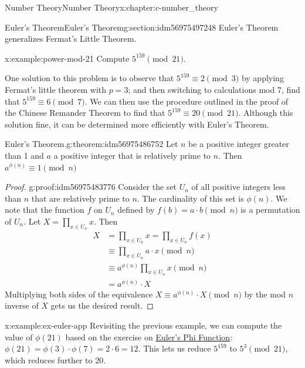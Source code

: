 \documentclass[twoside,10pt,]{book}
\numberwithin{equation}{section}
\begin{document}
\begin{chapterptx}{Number Theory}{}{Number Theory}{}{}{x:chapter:c-number_theory}
\typeout{************************************************}
%
\begin{sectionptx}{Euler's Theorem}{}{Euler's Theorem}{}{}{g:section:idm56975497248}
Euler's Theorem generalizes Fermat's Little Theorem.%
\begin{example}{}{x:example:power-mod-21}%
Compute \(5^{159} \pmod{21}\).%
\par
One solution to this problem is to observe that \(5^{159}\equiv 2 \pmod{3}\)  by applying Fermat's little theorem with \(p=3\); and then switching to calculations mod 7, find that \(5^{159}\equiv 6 \pmod{7}\).  We can then use the procedure outlined in the proof of the Chinese Remander Theorem to find that \(5^{159}\equiv 20 \pmod{21}\). Although this solution fine, it can be determined more efficiently with Euler's Theorem.%
\end{example}
\begin{theorem}{Euler's Theorem.}{}{g:theorem:idm56975486752}%
%
Let \(n\) be a positive integer greater than 1 and \(a\) a positive integer that is relatively prime to \(n\).  Then  \(a^{\phi(n)} \equiv 1 \pmod{n}\)%
\end{theorem}
\begin{proof}{}{g:proof:idm56975483776}
Consider the set \(U_n\) of all positive integers less than \(n\) that are relatively prime to \(n\). The cardinality of this set is \(\phi(n)\).  We note that the function \(f\) on \(U_n\) defined by \(f(b) = a \cdot b \pmod{n}\) is a permutation of \(U_n\). Let \(X=\prod_{x \in U_n} x\). Then%
\begin{equation*}
\begin{split}
X  &= \prod_{x \in U_n} x =  \prod_{x \in U_n} f(x) \\
&\equiv  \prod_{x \in U_n} a\cdot x \pmod{n} \\
&\equiv  a^{\phi(n)} \prod_{x \in U_n}  x \pmod{n} \\
& = a^{\phi(n)} \cdot X
\end{split}
\end{equation*}
Multiplying both sides of the equivalence \(X \equiv a^{\phi(n)} \cdot X \pmod{n}\) by the mod \(n\) inverse of \(X\) gets us the desired result.%
\end{proof}
\begin{example}{}{x:example:ex-euler-app}%
Revisiting the previous example, we can compute the value of \(\phi(21)\) based on the exercise on \hyperlink{x:exercise:exercise-euler-phi}{Euler's Phi Function}:  \(\phi(21)=\phi(3)\cdot\phi(7)=2 \cdot 6 = 12\).  This lets us reduce \(5^{159}\) to \(5^{3} \pmod{21}\), which reduces further to 20.%

\end{example}
\end{sectionptx}
\end{chapterptx}
\end{document}
